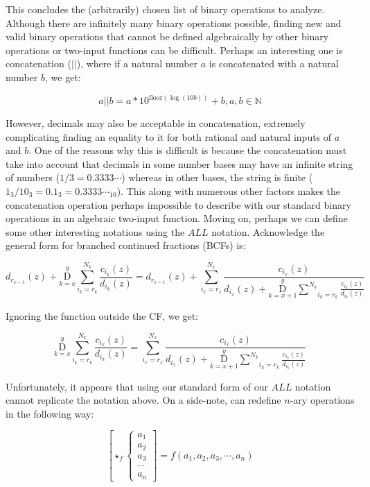 \documentclass{article}
\begin{document}
This concludes the (arbitrarily) chosen list of binary operations to analyze. Although there are infinitely many binary operations possible, finding new and valid binary operations that cannot be defined algebraically by other binary operations or two-input functions can be difficult. Perhaps an interesting one is concatenation ($||$), where if a natural number $a$ is concatenated with a natural number $b$, we get:

$$a || b = a*10^{\text{floor}(\log(10b))}+b, a,b \in \mathbb{N}$$

However, decimals may also be acceptable in concatenation, extremely complicating finding an equality to it for both rational and natural inputs of $a$ and $b$. One of the reasons why this is difficult is because the concatenation must take into account that decimals in some number bases may have an infinite string of numbers ($1 / 3= 0.3333\cdots$) whereas in other bases, the string is finite ($1_3 / 10_3 = 0.1_3 = 0.3333\cdots_{10}$). This along with numerous other factors makes the concatenation operation perhaps impossible to describe with our standard binary operations in an algebraic two-input function. Moving on, perhaps we can define some other interesting notations using the $ALL$ notation. Acknowledge the general form for branched continued fractions (BCFs) is:

$$d_{r_{x-1}}(z) + \underset{k=x}{\overset{y}{ \mathrm D}} \underset{i_k=r_k}{\overset{N_k}{ \sum}} \frac{c_{i_k} (z)}{d_{i_k} (z)} = d_{r_{x-1}}(z)+ \underset{i_x=r_x}{\overset{N_x}{ \sum}} \frac{c_{i_x}(z)}{d_{i_x}(z)+ \underset{k=x+1}{\overset{y}{ \mathrm D}} \underset{i_k=r_k}{\overset{N_k}{ \sum}} \frac{c_{i_k} (z)}{d_{i_k} (z)}}$$

Ignoring the function outside the CF, we get:

$$\underset{k=x}{\overset{y}{ \mathrm D}} \underset{i_k=r_k}{\overset{N_k}{ \sum}} \frac{c_{i_k} (z)}{d_{i_k} (z)} = \underset{i_x=r_x}{\overset{N_x}{ \sum}} \frac{c_{i_x}(z)}{d_{i_x}(z)+ \underset{k=x+1}{\overset{y}{ \mathrm D}} \underset{i_k=r_k}{\overset{N_k}{ \sum}} \frac{c_{i_k} (z)}{d_{i_k} (z)}}$$

Unfortunately, it appears that using our standard form of our $ALL$ notation cannot replicate the notation above. On a side-note, can redefine $n$-ary operations in the following way:

$$\left[ \star_f \left\{ \begin{array}{rcl}
a_1 \\ a_2 \\ a_3 \\ \cdots \\ a_n
\end{array}\right. \right] = f(a_1, a_2, a_3, \cdots, a_n)$$
\end{document}
